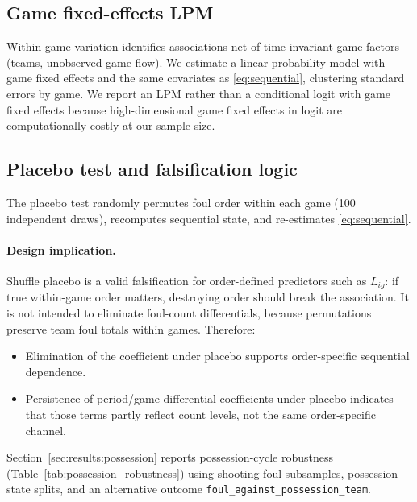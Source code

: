 \subsection{Game fixed-effects LPM}

Within-game variation identifies associations net of time-invariant game factors (teams, unobserved game flow). We estimate a linear probability model with game fixed effects and the same covariates as \eqref{eq:sequential}, clustering standard errors by game. We report an LPM rather than a conditional logit with game fixed effects because high-dimensional game fixed effects in logit are computationally costly at our sample size.

\subsection{Placebo test and falsification logic}

The placebo test randomly permutes foul order within each game (100 independent draws), recomputes sequential state, and re-estimates \eqref{eq:sequential}.

\paragraph{Design implication.}
Shuffle placebo is a valid falsification for order-defined predictors such as $L_{ig}$: if true within-game order matters, destroying order should break the association. It is not intended to eliminate foul-count differentials, because permutations preserve team foul totals within games. Therefore:
\begin{itemize}
  \item Elimination of the \foullast{} coefficient under placebo supports order-specific sequential dependence.
  \item Persistence of period/game differential coefficients under placebo indicates that those terms partly reflect count levels, not the same order-specific channel.
\end{itemize}

Section~\ref{sec:results:possession} reports possession-cycle robustness (Table~\ref{tab:possession_robustness}) using shooting-foul subsamples, possession-state splits, and an alternative outcome \texttt{foul\_against\_possession\_team}.
